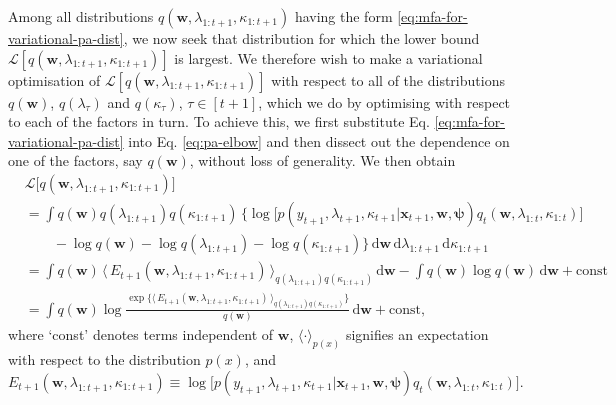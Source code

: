 Among all distributions $q(\mathbf{w}, \lambda_{1:t+1}, \kappa_{1:t+1})$ having the form \eqref{eq:mfa-for-variational-pa-dist}, we now seek that distribution for which the lower bound $\mathcal{L}[q(\mathbf{w}, \lambda_{1:t+1}, \kappa_{1:t+1})]$ is largest. We therefore wish to make a variational optimisation of $\mathcal{L}[q(\mathbf{w}, \lambda_{1:t+1}, \kappa_{1:t+1})]$ with respect to all of the distributions $q(\mathbf{w})$, $q(\lambda_\tau)$ and $q(\kappa_\tau)$, $\tau \in [t+1]$, which we do by optimising with respect to each of the factors in turn. To achieve this, we first substitute Eq. \eqref{eq:mfa-for-variational-pa-dist} into Eq. \eqref{eq:pa-elbow} and then dissect out the dependence on one of the factors, say $q(\mathbf{w})$, without loss of generality. We then obtain
\begin{align}
\label{eq:pa-elbow-after-mfa}
	& \mathcal{L}\big[q(\mathbf{w}, \lambda_{1:t+1}, \kappa_{1:t+1})\big]
	\nonumber \\	
	&= \int q(\mathbf{w})q(\lambda_{1:t+1})q(\kappa_{1:t+1})\,\Big\{\log\big[p(y_{t+1}, \lambda_{t+1}, \kappa_{t+1}|\mathbf{x}_{t+1}, \mathbf{w}, \boldsymbol{\psi})q_{t}(\mathbf{w}, \lambda_{1:t}, \kappa_{1:t})\big]
	\nonumber \\
	& \qquad - \log q(\mathbf{w})
	- \log q(\lambda_{1:t+1})
	- \log q(\kappa_{1:t+1})\Big\}
	\,\mathrm{d}\mathbf{w}\,\mathrm{d}\lambda_{1:t+1}\,\mathrm{d}\kappa_{1:t+1}
	\nonumber \\
	&= \int q(\mathbf{w})\,\langle\, E_{t+1}(\mathbf{w}, \lambda_{1:t+1}, \kappa_{1:t+1})\,\rangle_{q(\lambda_{1:t+1})q(\kappa_{1:t+1})}\,\mathrm{d}\mathbf{w}
	- \int q(\mathbf{w})\log q(\mathbf{w})\,\mathrm{d}\mathbf{w} + \text{const}
	\nonumber \\
	&= \int q(\mathbf{w})\log\frac{\exp\big\{\langle\, E_{t+1}(\mathbf{w}, \lambda_{1:t+1}, \kappa_{1:t+1})\,\rangle_{q(\lambda_{1:t+1})q(\kappa_{1:t+1})}\big\}}{q(\mathbf{w})}\,\mathrm{d}\mathbf{w} + \text{const},
\end{align}
where `const' denotes terms independent of $\mathbf{w}$, $\langle\cdot\rangle_{p(x)}$ signifies an expectation with respect to the distribution $p(x)$, and
\begin{equation}
\label{eq:pa-energy}
	E_{t+1}(\mathbf{w}, \lambda_{1:t+1}, \kappa_{1:t+1})
	\equiv \log\big[p(y_{t+1}, \lambda_{t+1}, \kappa_{t+1}|\mathbf{x}_{t+1}, \mathbf{w}, \boldsymbol{\psi})q_{t}(\mathbf{w}, \lambda_{1:t}, \kappa_{1:t})\big].
\end{equation}


